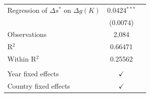 \centering
\begin{tabularx}{\columnwidth}{lcc}
   Regression of $\Delta s^*$ on $\Delta g(K)$   & 0.0424$^{***}$\\   
                                                 & (0.0074)\\   
   Observations                                  & 2,084\\  
   R$^2$                                         & 0.66471\\  
   Within R$^2$                                  & 0.25562\\  
    \\
   Year fixed effects                            & $\checkmark$\\   
   Country fixed effects                         & $\checkmark$\\   
\end{tabularx}
   \label{tbl-wid_si_table}

